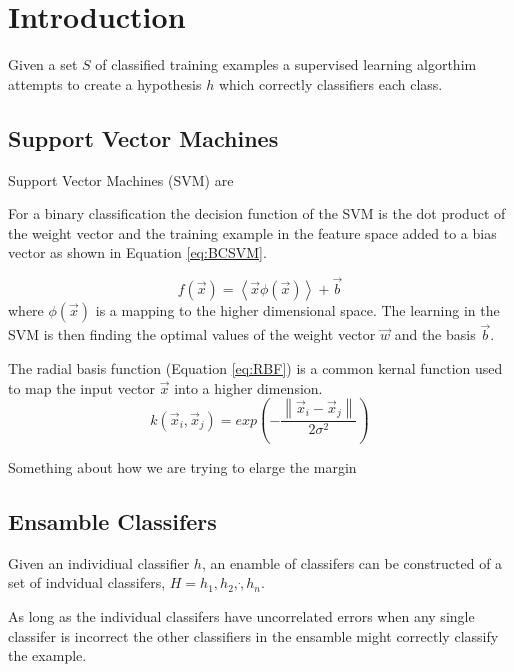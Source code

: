 \section{Introduction}

Given a set $S$ of classified training examples a supervised learning algorthim attempts to create a hypothesis $h$ which correctly classifiers each class.

\subsection{Support Vector Machines}
Support Vector Machines (SVM) are

For a binary classification the decision function of the SVM is the dot product of the weight vector and the training example in the feature space added to a bias vector as shown in Equation \ref{eq:BCSVM}.

\begin{equation}
\label{eq:BCSVM}
f \left ( \vec{x} \right ) = \left \langle \vec{x} \phi(\vec{x}) \right \rangle + \vec{b}
\end{equation}
where $\phi(\vec{x})$ is a mapping to the higher dimensional space.
The learning in the SVM is then finding the optimal values of the weight vector $\vec{w}$ and the basis $\vec{b}$.

The radial basis function (Equation \ref{eq:RBF}) is a common kernal function used to map the input vector $\vec{x}$ into a higher dimension.
\begin{equation}
\label{eq:RBF}
k \left ( \vec{x}_i , \vec{x}_j \right ) = exp \left ( - \frac{\left \| \vec{x}_i - \vec{x}_j \right \|}{2\sigma^2} \right ) 
\end{equation}

Something about how we are trying to elarge the margin

\subsection{Ensamble Classifers}
Given an individiual classifier $h$, an enamble of classifers can be constructed of a set of indvidual classifers, $H={h_1, h_2,\dot, h_n}$.

As long as the individual classifers have uncorrelated errors when any single classifer is incorrect the other classifiers in the ensamble might correctly classify the example.

